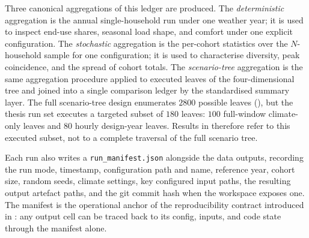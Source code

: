 Three canonical aggregations of this ledger are produced. 
\newline The \emph{deterministic} aggregation is the annual single-household run under one weather year; it is used to inspect end-use shares, seasonal load shape, and comfort under one explicit configuration. 
\newline The \emph{stochastic} aggregation is the per-cohort statistics over the $N$-household sample for one configuration; it is used to characterise diversity, peak coincidence, and the spread of cohort totals. 
\newline The \emph{scenario-tree} aggregation is the same aggregation procedure applied to executed leaves of the four-dimensional tree and joined into a single comparison ledger by the standardised summary layer. The full scenario-tree design enumerates $2800$ possible leaves (), but the thesis run set executes a targeted subset of $180$ leaves: $100$ full-window climate-only leaves and $80$ hourly design-year leaves. Results in  therefore refer to this executed subset, not to a complete traversal of the full scenario tree.

Each run also writes a \texttt{run\_manifest.json} alongside the data outputs, recording the run mode, timestamp, configuration path and name, reference year, cohort size, random seeds, climate settings, key configured input paths, the resulting output artefact paths, and the git commit hash when the workspace exposes one. The manifest is the operational anchor of the reproducibility contract introduced in : any output cell can be traced back to its config, inputs, and code state through the manifest alone.


